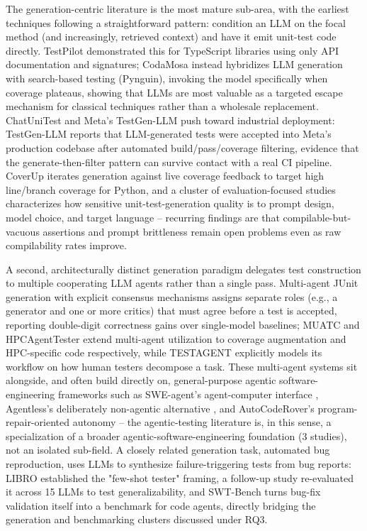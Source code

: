 The generation-centric literature is the most mature sub-area, with
the earliest techniques following a straightforward pattern: condition
an LLM on the focal method (and increasingly, retrieved context) and
have it emit unit-test code directly. TestPilot
\cite{slr0112024} demonstrated this for TypeScript libraries using
only API documentation and signatures; CodaMosa \cite{slr0122023}
instead hybridizes LLM generation with search-based testing
(Pynguin), invoking the model specifically when coverage plateaus,
showing that LLMs are most valuable as a targeted escape mechanism
for classical techniques rather than a wholesale replacement.
ChatUniTest \cite{slr0132024} and Meta's TestGen-LLM
\cite{slr0142024} push toward industrial deployment: TestGen-LLM
reports that LLM-generated tests were accepted into Meta's production
codebase after automated build/pass/coverage filtering, evidence that
the generate-then-filter pattern can survive contact with a real CI
pipeline. CoverUp \cite{slr0152025} iterates generation against live
coverage feedback to target high line/branch coverage for Python, and
a cluster of evaluation-focused studies
\cite{slr0162024,slr0172024,slr0182024} characterizes how sensitive
unit-test-generation quality is to prompt design, model choice, and
target language -- recurring findings are that compilable-but-vacuous
assertions and prompt brittleness remain open problems even as raw
compilability rates improve.

A second, architecturally distinct generation paradigm delegates test
construction to multiple cooperating LLM agents rather than a single
pass. Multi-agent JUnit generation with explicit consensus mechanisms
\cite{slr0192025,xu2025candor} assigns separate roles (e.g., a
generator and one or more critics) that must agree before a test is
accepted, reporting double-digit correctness gains over single-model
baselines; MUATC \cite{slr0202025} and HPCAgentTester
\cite{slr0212025} extend multi-agent utilization to coverage
augmentation and HPC-specific code respectively, while TESTAGENT
\cite{slr0222026} explicitly models its workflow on how human testers
decompose a task. These multi-agent systems sit alongside, and often
build directly on, general-purpose agentic software-engineering
frameworks such as SWE-agent's agent-computer interface
\cite{slr0232024}, Agentless's deliberately non-agentic alternative
\cite{slr0242024}, and AutoCodeRover's program-repair-oriented
autonomy \cite{slr0252024} -- the agentic-testing literature is, in
this sense, a specialization of a broader agentic-software-engineering
foundation (3 studies), not an isolated sub-field. A closely related
generation task, automated bug reproduction, uses LLMs to synthesize
failure-triggering tests from bug reports: LIBRO \cite{slr0262023}
established the "few-shot tester" framing, a follow-up study
\cite{slr0272023} re-evaluated it across 15 LLMs to test
generalizability, and SWT-Bench \cite{slr0282024} turns bug-fix
validation itself into a benchmark for code agents, directly bridging
the generation and benchmarking clusters discussed under RQ3.


